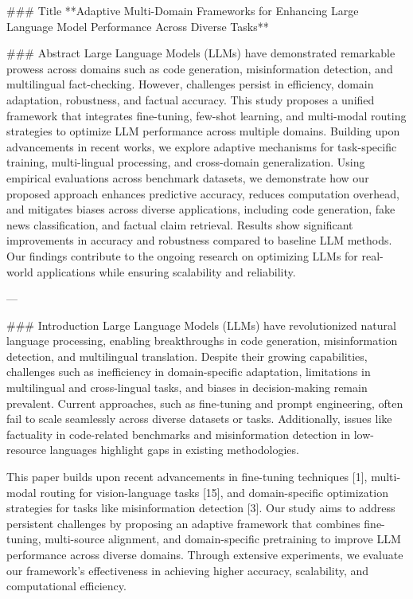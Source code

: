 ### Title  
**Adaptive Multi-Domain Frameworks for Enhancing Large Language Model Performance Across Diverse Tasks**

### Abstract  
Large Language Models (LLMs) have demonstrated remarkable prowess across domains such as code generation, misinformation detection, and multilingual fact-checking. However, challenges persist in efficiency, domain adaptation, robustness, and factual accuracy. This study proposes a unified framework that integrates fine-tuning, few-shot learning, and multi-modal routing strategies to optimize LLM performance across multiple domains. Building upon advancements in recent works, we explore adaptive mechanisms for task-specific training, multi-lingual processing, and cross-domain generalization. Using empirical evaluations across benchmark datasets, we demonstrate how our proposed approach enhances predictive accuracy, reduces computation overhead, and mitigates biases across diverse applications, including code generation, fake news classification, and factual claim retrieval. Results show significant improvements in accuracy and robustness compared to baseline LLM methods. Our findings contribute to the ongoing research on optimizing LLMs for real-world applications while ensuring scalability and reliability.

---

### Introduction  
Large Language Models (LLMs) have revolutionized natural language processing, enabling breakthroughs in code generation, misinformation detection, and multilingual translation. Despite their growing capabilities, challenges such as inefficiency in domain-specific adaptation, limitations in multilingual and cross-lingual tasks, and biases in decision-making remain prevalent. Current approaches, such as fine-tuning and prompt engineering, often fail to scale seamlessly across diverse datasets or tasks. Additionally, issues like factuality in code-related benchmarks and misinformation detection in low-resource languages highlight gaps in existing methodologies.

This paper builds upon recent advancements in fine-tuning techniques [1], multi-modal routing for vision-language tasks [15], and domain-specific optimization strategies for tasks like misinformation detection [3]. Our study aims to address persistent challenges by proposing an adaptive framework that combines fine-tuning, multi-source alignment, and domain-specific pretraining to improve LLM performance across diverse domains. Through extensive experiments, we evaluate our framework's effectiveness in achieving higher accuracy, scalability, and computational efficiency.

